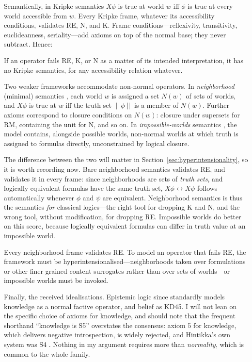 Semantically, in Kripke semantics $X\phi$ is true at world $w$ iff $\phi$ is
true at every world accessible from $w$. Every Kripke frame, whatever its
accessibility conditions, validates RE, N, and K. Frame conditions---reflexivity,
transitivity, euclideanness, seriality---add axioms on top of the normal base;
they never subtract. Hence:

\begin{fact}
\label{fact:kripke}
If an operator fails RE, K, or N as a matter of its intended interpretation, it
has no Kripke semantics, for any accessibility relation whatever.
\end{fact}

Two weaker frameworks accommodate non-normal operators. In \emph{neighborhood}
(minimal) semantics \citep{scott1970,montague1970,chellas1980}, each world $w$ is
assigned a set $N(w)$ of sets of worlds, and $X\phi$ is true at $w$ iff the
truth set $\lVert \phi \rVert$ is a member of $N(w)$. Further axioms correspond
to closure conditions on $N(w)$: closure under supersets for RM, containing the
unit for N, and so on. In \emph{impossible-worlds} semantics
\citep{rantala1982,nolan1997,priest2005,berto2019}, the model contains, alongside
possible worlds, non-normal worlds at which truth is assigned to formulas
directly, unconstrained by logical closure.

The difference between the two will matter in
Section~\ref{sec:hyperintensionality}, so it is worth recording now. Bare
neighborhood semantics validates RE, and validates it in every frame: since
neighborhoods are sets of \emph{truth sets}, and logically equivalent formulas
have the same truth set, $X\phi \leftrightarrow X\psi$ follows automatically
whenever $\phi$ and $\psi$ are equivalent. Neighborhood semantics is thus the
semantics \emph{for} classical logics---the right tool for dropping K and N, and
the wrong tool, without modification, for dropping RE. Impossible worlds do
better on this score, because logically equivalent formulas can differ in truth
value at an impossible world.

\begin{fact}
\label{fact:neighborhood}
Every neighborhood frame validates RE. To model an operator that fails RE, the
framework must be hyperintensionalised---neighborhoods taken over formulations or
other finer-grained content surrogates rather than over sets of worlds---or
impossible worlds must be invoked.
\end{fact}

Finally, the received idealisations. Epistemic logic since \citet{hintikka1962}
standardly models knowledge as a normal factive operator, and belief as KD45.
I will not lean on the specific choice of axioms for knowledge, and should note
that the frequent shorthand ``knowledge is S5'' overstates the consensus: axiom
5 for knowledge, which delivers negative introspection, is widely rejected, and
Hintikka's own system was S4 \citep{lenzen1978}. Nothing in my argument requires
more than \emph{normality}, which is common to the whole family.

